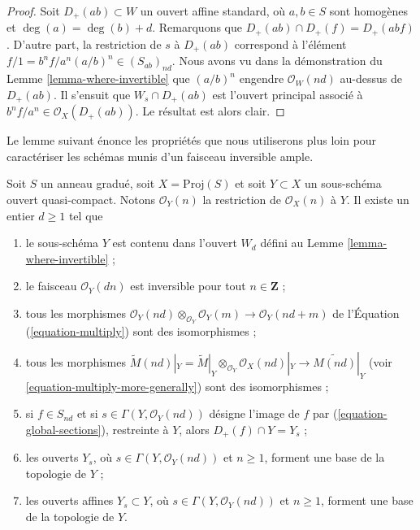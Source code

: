 \begin{proof}
Soit $D_{+}(ab) \subset W$ un ouvert affine standard, où $a, b \in S$ sont
homogènes et $\deg(a) = \deg(b) + d$. Remarquons que
$D_{+}(ab) \cap D_{+}(f) = D_{+}(abf)$. D'autre part, la restriction de $s$
à $D_{+}(ab)$ correspond à l'élément
$f/1 = b^nf/a^n (a/b)^n \in (S_{ab})_{nd}$.
Nous avons vu dans la démonstration du Lemme \ref{lemma-where-invertible} que
$(a/b)^n$ engendre $\mathcal{O}_W(nd)$ au-dessus de $D_{+}(ab)$.
Il s'ensuit que $W_s \cap D_{+}(ab)$ est l'ouvert principal associé à
$b^nf/a^n \in \mathcal{O}_X(D_{+}(ab))$. Le résultat est alors clair.
\end{proof}

\noindent
Le lemme suivant énonce les propriétés que nous utiliserons plus loin pour
caractériser les schémas munis d'un faisceau inversible ample.

\begin{lemma}
\label{lemma-ample-on-proj}
Soit $S$ un anneau gradué, soit $X = \text{Proj}(S)$ et soit
$Y \subset X$ un sous-schéma ouvert quasi-compact. Notons
$\mathcal{O}_Y(n)$ la restriction de $\mathcal{O}_X(n)$ à $Y$.
Il existe un entier $d \geq 1$ tel que
\begin{enumerate}
\item le sous-schéma $Y$ est contenu dans l'ouvert $W_d$ défini au
Lemme \ref{lemma-where-invertible} ;
\item le faisceau $\mathcal{O}_Y(dn)$ est inversible pour tout
$n \in \mathbf{Z}$ ;
\item tous les morphismes
$\mathcal{O}_Y(nd) \otimes_{\mathcal{O}_Y} \mathcal{O}_Y(m)
\longrightarrow
\mathcal{O}_Y(nd + m)$
de l'Équation (\ref{equation-multiply}) sont des isomorphismes ;
\item tous les morphismes
$\widetilde M(nd)|_Y = \widetilde M|_Y \otimes_{\mathcal{O}_Y}
\mathcal{O}_X(nd)|_Y \to \widetilde{M(nd)}|_Y$
(voir \ref{equation-multiply-more-generally}) sont des isomorphismes ;
\item si $f \in S_{nd}$ et si $s \in \Gamma(Y, \mathcal{O}_Y(nd))$ désigne
l'image de $f$ par (\ref{equation-global-sections}), restreinte à $Y$, alors
$D_{+}(f) \cap Y = Y_s$ ;
\item les ouverts $Y_s$, où $s \in \Gamma(Y, \mathcal{O}_Y(nd))$ et
$n \geq 1$, forment une base de la topologie de $Y$ ;
\item les ouverts affines $Y_s \subset Y$, où
$s \in \Gamma(Y, \mathcal{O}_Y(nd))$ et $n \geq 1$, forment une base de la
topologie de $Y$.
\end{enumerate}
\end{lemma}

